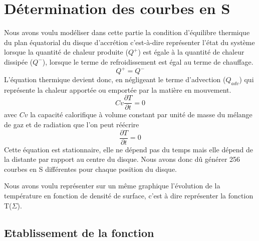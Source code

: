 \section{Détermination des courbes en S}

Nous avons voulu modéliser dans cette partie la condition d'équilibre thermique du plan équatorial du disque d'accrétion c'est-à-dire représenter l'état du système lorsque la quantité de chaleur produite ($Q^+$) est égale à la quantité de chaleur dissipée ($Q^-$), lorsque le terme de refroidissement est égal au terme de chauffage.
\begin{equation}
Q^+ = Q^-
\end{equation}
L'équation thermique devient donc, en négligeant le terme d'advection ($Q_{adv}$) qui représente la chaleur apportée ou emportée par la matière en mouvement.
\begin{equation}
Cv\frac{\partial T}{\partial t} = 0
\end{equation}
avec $Cv$ la capacité calorifique à volume constant par unité de masse du mélange de gaz et de radiation que l'on peut réécrire
\begin{equation}
\frac{\partial T}{\partial t} = 0
\end{equation}
Cette équation est stationnaire, elle ne dépend pas du temps mais elle dépend de la distante par rapport au centre du disque. Nous avons donc dû générer 256 courbes en S différentes pour chaque position du disque.

Nous avons voulu représenter sur un même graphique l'évolution de la température en fonction de densité de surface, c'est à dire représenter la fonction T($\Sigma$).
\\   

\subsection{Etablissement de la fonction}


